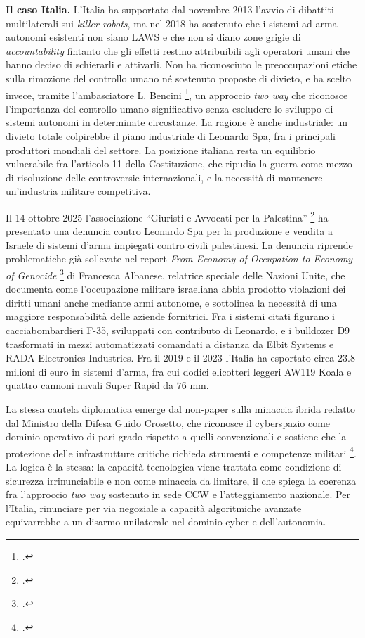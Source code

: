 \documentclass[a4paper,12pt]{report}
\begin{document}
\textbf{Il caso Italia.}
L'Italia ha supportato dal novembre 2013 l'avvio di dibattiti multilaterali sui
\textit{killer robots}, ma nel 2018 ha sostenuto che i sistemi ad arma autonomi
esistenti non siano LAWS e che non si diano zone grigie di
\textit{accountability} fintanto che gli effetti restino attribuibili agli
operatori umani che hanno deciso di schierarli e attivarli. Non ha riconosciuto
le preoccupazioni etiche sulla rimozione del controllo umano né sostenuto
proposte di divieto, e ha scelto invece, tramite l'ambasciatore L. Bencini
\footcite{ccw_2019}, un approccio \textit{two way} che riconosce l'importanza
del controllo umano significativo senza escludere lo sviluppo di sistemi
autonomi in determinate circostanze. La ragione è anche industriale: un divieto
totale colpirebbe il piano industriale di Leonardo Spa, fra i principali
produttori mondiali del settore. La posizione italiana resta un equilibrio
vulnerabile fra l'articolo 11 della Costituzione, che ripudia la guerra come
mezzo di risoluzione delle controversie internazionali, e la necessità di
mantenere un'industria militare competitiva.
 
Il 14 ottobre 2025 l'associazione ``Giuristi e Avvocati per la Palestina''
\footcite{denunciacpi} ha presentato una denuncia contro Leonardo Spa per la
produzione e vendita a Israele di sistemi d'arma impiegati contro civili
palestinesi. La denuncia riprende problematiche già sollevate nel report
\textit{From Economy of Occupation to Economy of Genocide}
\footcite{albanese_report} di Francesca Albanese, relatrice speciale delle
Nazioni Unite, che documenta come l'occupazione militare israeliana abbia
prodotto violazioni dei diritti umani anche mediante armi autonome, e sottolinea
la necessità di una maggiore responsabilità delle aziende fornitrici. Fra i
sistemi citati figurano i cacciabombardieri F-35, sviluppati con contributo di
Leonardo, e i bulldozer D9 trasformati in mezzi automatizzati comandati a
distanza da Elbit Systems e RADA Electronics Industries. Fra il 2019 e il 2023
l'Italia ha esportato circa $23.8$ milioni di euro in sistemi d'arma, fra cui
dodici elicotteri leggeri AW119 Koala e quattro cannoni navali Super Rapid da
$76$ mm.
 
La stessa cautela diplomatica emerge dal non-paper sulla minaccia ibrida redatto
dal Ministro della Difesa Guido Crosetto, che riconosce il cyberspazio come
dominio operativo di pari grado rispetto a quelli convenzionali e sostiene che
la protezione delle infrastrutture critiche richieda strumenti e competenze
militari \footcite{crosetto_2025_nonpaper}. La logica è la stessa: la capacità
tecnologica viene trattata come condizione di sicurezza irrinunciabile e non
come minaccia da limitare, il che spiega la coerenza fra l'approccio \textit{two
way} sostenuto in sede CCW e l'atteggiamento nazionale. Per l'Italia, rinunciare
per via negoziale a capacità algoritmiche avanzate equivarrebbe a un disarmo
unilaterale nel dominio cyber e dell'autonomia.
 
\end{document}
